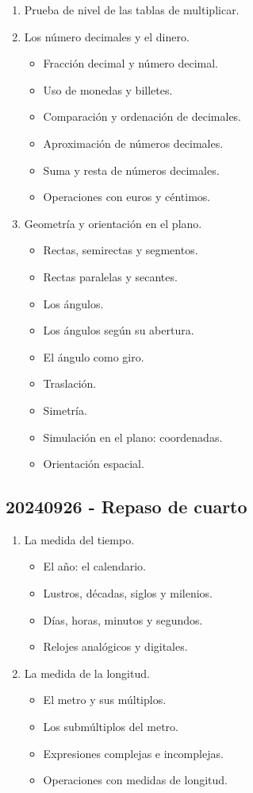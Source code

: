 \documentclass[a4paper,12pt]{article}
\begin{document}
\begin{enumerate}
    \item Prueba de nivel de las tablas de multiplicar.
    \item Los número decimales y el dinero.
    \begin{itemize}
        \item Fracción decimal y número decimal.
        \item Uso de monedas y billetes.
        \item Comparación y ordenación de decimales.
        \item Aproximación de números decimales.
        \item Suma y resta de números decimales.
        \item Operaciones con euros y céntimos.
    \end{itemize}
    \item Geometría y orientación en el plano.
    \begin{itemize}
        \item Rectas, semirectas y segmentos.
        \item Rectas paralelas y secantes.
        \item Los ángulos.
        \item Los ángulos según su abertura.
        \item El ángulo como giro.
        \item Traslación.
        \item Simetría.
        \item Simulación en el plano: coordenadas.
        \item Orientación espacial.
    \end{itemize}
\end{enumerate}

\subsection{20240926 - Repaso de cuarto}

\begin{enumerate}
    \item La medida del tiempo.
    \begin{itemize}
        \item El año: el calendario.
        \item Lustros, décadas, siglos y milenios.
        \item Días, horas, minutos y segundos.
        \item Relojes analógicos y digitales.
    \end{itemize}
    \item La medida de la longitud.
    \begin{itemize}
        \item El metro y sus múltiplos.
        \item Los submúltiplos del metro.
        \item Expresiones complejas e incomplejas.
        \item Operaciones con medidas de longitud.
    \end{itemize}
\end{enumerate}
\end{document}
